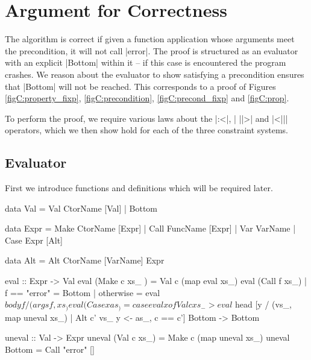 \ignore{}



\section{Argument for Correctness}
\label{secC:correct}

\newcommand{\lemma}[1]{(\textit{#1})}
\newcommand{\theorem}[2]{#2 \hspace{5mm} \lemma{#1} \\}
\newcommand{\proof}[2][]{\paragraph{\lemma{#2} \textsf{#1}}}

The algorithm is correct if given a function application whose arguments meet the precondition, it will not call |error|. The proof is structured as an evaluator with an explicit |Bottom| within it -- if this case is encountered the program crashes. We reason about the evaluator to show satisfying a precondition ensures that |Bottom| will not be reached. This corresponds to a proof of Figures \ref{figC:property_fixp}, \ref{figC:precondition}, \ref{figC:precond_fixp} and \ref{figC:prop}.

To perform the proof, we require various laws about the |:<|, | ||>| and |<||| operators, which we then show hold for each of the three constraint systems.

\subsection{Evaluator}

First we introduce functions and definitions which will be required later.

\begin{code}
data Val  =  Val CtorName [Val]
          |  Bottom

data Expr  =  Make CtorName [Expr]
           |  Call FuncName [Expr]
           |  Var  VarName
           |  Case Expr [Alt]

data Alt = Alt CtorName [VarName] Expr

eval :: Expr -> Val
eval (Make c xs_   ) = Val c (map eval xs_)
eval (Call f xs_)  | f == "error" = Bottom
                   | otherwise = eval $ body f / (args f, xs_)
eval (Case x as_  ) = case eval x of
    Val c xs_ -> eval $ head [y / (vs_, map uneval xs_) | Alt c' vs_ y <- as_, c == c']
    Bottom -> Bottom

uneval :: Val -> Expr
uneval (Val c xs_)  = Make c (map uneval xs_)
uneval Bottom       = Call "error" []
\end{code}


